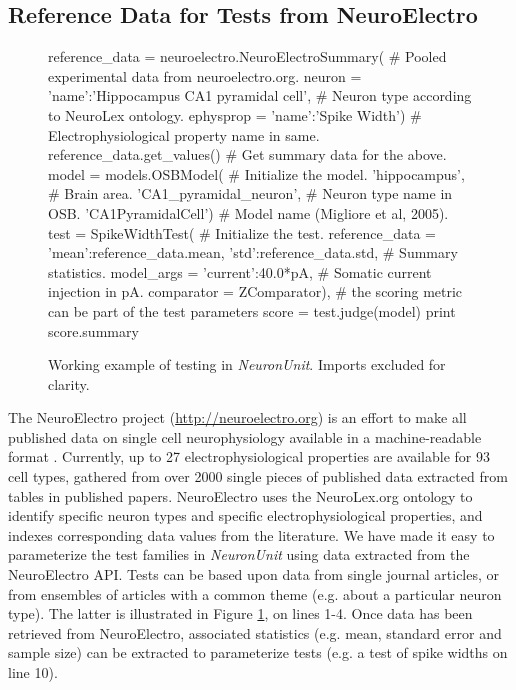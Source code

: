 \documentclass{frontiersSCNS}
\begin{document}
\subsection{Reference Data for Tests from NeuroElectro}\label{sec:neuroelectro} 
\begin{figure}
\begin{python}
reference_data = neuroelectro.NeuroElectroSummary( # Pooled experimental data from neuroelectro.org. 
  neuron = {'name':'Hippocampus CA1 pyramidal cell'}, # Neuron type according to NeuroLex ontology.  
  ephysprop = {'name':'Spike Width'}) # Electrophysiological property name in same.
reference_data.get_values()  # Get summary data for the above. 
model = models.OSBModel( # Initialize the model.
        'hippocampus', # Brain area.  
        'CA1_pyramidal_neuron', # Neuron type name in OSB.  
        'CA1PyramidalCell') # Model name (Migliore et al, 2005).
test = SpikeWidthTest( # Initialize the test.    
	reference_data = {'mean':reference_data.mean, 'std':reference_data.std}, # Summary statistics.
	model_args = {'current':40.0*pA}, # Somatic current injection in pA.  
	comparator = ZComparator), # the scoring metric can be part of the test parameters 
score = test.judge(model)
print score.summary
\end{python}
\vspace{-15px}
\caption{Working example of testing in \textit{NeuronUnit}. Imports excluded for clarity.}
\label{fig:neuronunit_example}

\end{figure}
The NeuroElectro project (\url{http://neuroelectro.org}) is an effort to make all published data on single cell neurophysiology available in a machine-readable format \citep{tripathy_neuroelectro:_2012}.  
Currently, up to 27 electrophysiological properties are available for 93 cell types, gathered from over 2000 single pieces of published data extracted from tables in published papers. 
NeuroElectro uses the NeuroLex.org ontology \cite{larson_neurolex_2013} to identify specific neuron types and specific electrophysiological properties, and indexes corresponding data values from the literature.  
We have made it easy to parameterize the test families in \textit{Neuron\-Unit}  using data extracted from the NeuroElectro API. 
Tests can be based upon data from single journal articles, or from ensembles of articles with a common theme (e.g. about a particular neuron type). 
The latter is illustrated in Figure \ref{fig:neuronunit_example}, on lines 1-4. 
Once data has been retrieved from NeuroElectro, associated statistics (e.g. mean, standard error and sample size) can be extracted to parameterize tests (e.g. a test of spike widths on line 10). 
\end{document}
